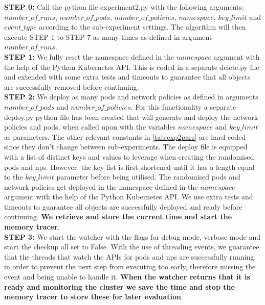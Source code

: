 \textbf{STEP 0:} Call the python file experiment2.py with the following arguments: $number\_of\_runs$, $number\_of\_pods$, $number\_of\_policies$, $namespace$, $key\_limit$ and $event\_type$ according to the sub-experiment settings. The algorithm will then execute STEP 1 to STEP 7 as many times as defined in argument $number\_of\_runs$.
\\[10pt]

\textbf{STEP 1:} We fully reset the namespace defined in the $namespace$ argument with the help of the Python Kubernetes API. This is coded in a separate delete.py file and extended with some extra tests and timeouts to guarantee that all objects are successfully removed before continuing.
\\[10pt]

\textbf{STEP 2:} We deploy as many pods and network policies as defined in arguments \newline $number\_of\_pods$ and $number\_of\_policies$. For this functionality a separate deploy.py python file has been created that will generate and deploy the network policies and pods, when called upon with the variables $namespace$ and $key\_limit$ as parameters. The other relevant constants in \autoref{tab:exp2pars} are hard coded since they don't change between sub-experiments. The deploy file is equipped with a list of distinct keys and values to leverage when creating the randomised pods and \acrshort{np}s. However, the key list is first shortened until it has a length equal to the $key\_limit$ parameter before being utilised. The randomised pods and network policies get deployed in the namespace defined in the $namespace$ argument with the help of the Python Kubernetes API. We use extra tests and timeouts to guarantee all objects are successfully deployed and ready before continuing. 
\textbf{We retrieve and store the current time and start the memory tracer}.
\\[10pt]

\textbf{STEP 3:} We start the watcher with the flags for debug mode,  verbose mode and start the checkup all set to False. With the use of threading events, we guarantee that the threads that watch the APIs for pods and \acrshort{np}s are successfully running, in order to prevent the next step from executing too early, therefore missing the event and being unable to handle it. \textbf{When the watcher returns that it is ready and monitoring the cluster we save the time and stop the memory tracer to store these for later evaluation}.
\\[10pt]

